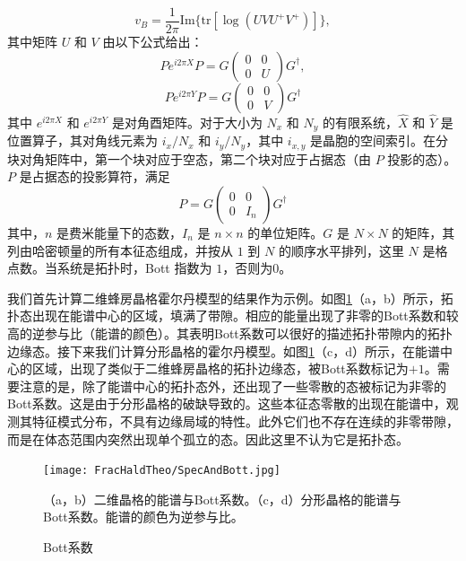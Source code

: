 \begin{equation}
    v_B = \frac{1}{2\pi} \text{Im}\{\text{tr}[\log(UVU^+V^+)]\},
\end{equation}
其中矩阵 \(U\) 和 \(V\) 由以下公式给出：
\begin{equation}
    Pe^{i2\pi X}P = G\begin{pmatrix} 0 & 0 \\ 0 & U \end{pmatrix}G^\dagger,
    \label{eq:projectP}
\end{equation}
\begin{equation}
Pe^{i2\pi Y}P = G\begin{pmatrix} 0 & 0 \\ 0 & V \end{pmatrix}G^\dagger
\end{equation}
其中 \(e^{i2\pi X}\) 和 \(e^{i2\pi Y}\) 是对角酉矩阵。对于大小为 \(N_x\) 和 \(N_y\) 的有限系统，\(\hat{X}\) 和 \(\hat{Y}\) 是位置算子，其对角线元素为 \(i_x/N_x\) 和 \(i_y/N_y\)，其中 \(i_{x,y}\) 是晶胞的空间索引。在分块对角矩阵中，第一个块对应于空态，第二个块对应于占据态（由 \(P\) 投影的态）。 \(P\) 是占据态的投影算符，满足
\begin{equation}
P = G\begin{pmatrix} 0 & 0 \\ 0 & I_n \end{pmatrix}G^\dagger
\end{equation}
其中，$n$ 是费米能量下的态数，$I_n$ 是 $n \times n$ 的单位矩阵。$G$ 是 $N \times N$ 的矩阵，其列由哈密顿量的所有本征态组成，并按从 $1$ 到 $N$ 的顺序水平排列，这里 $N$ 是格点数。当系统是拓扑时，Bott 指数为 $1$，否则为0。

我们首先计算二维蜂房晶格霍尔丹模型的结果作为示例。如图\ref{fig:SpecAndBott}（a，b）所示，拓扑态出现在能谱中心的区域，填满了带隙。相应的能量出现了非零的Bott系数和较高的逆参与比（能谱的颜色）。其表明Bott系数可以很好的描述拓扑带隙内的拓扑边缘态。接下来我们计算分形晶格的霍尔丹模型。如图\ref{fig:SpecAndBott}（c，d）所示，在能谱中心的区域，出现了类似于二维蜂房晶格的拓扑边缘态，被Bott系数标记为$+1$。需要注意的是，除了能谱中心的拓扑态外，还出现了一些零散的态被标记为非零的Bott系数。这是由于分形晶格的破缺导致的。这些本征态零散的出现在能谱中，观测其特征模式分布，不具有边缘局域的特性。此外它们也不存在连续的非零带隙，而是在体态范围内突然出现单个孤立的态。因此这里不认为它是拓扑态。
\begin{figure}[htbp]
    \centering
    \texttt{[image: FracHaldTheo/SpecAndBott.jpg]}
    \caption{Bott系数}（a，b）二维晶格的能谱与Bott系数。（c，d）分形晶格的能谱与Bott系数。能谱的颜色为逆参与比。
    \label{fig:SpecAndBott}
\end{figure}
